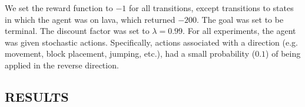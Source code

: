 \documentclass[]{article}
\begin{document}
We set the reward function to $-1$ for all transitions, except
transitions to states in which the agent was on lava, which returned 
$-200$. The goal was set to be terminal. The discount
factor was set to $\lambda = 0.99$. For all experiments, the agent was given stochastic actions. Specifically, actions associated with a direction (e.g. movement, block placement, jumping, etc.), had a small probability ($0.1$) of being applied in the reverse direction.




\subsection{RESULTS}


%
%
\end{document}
